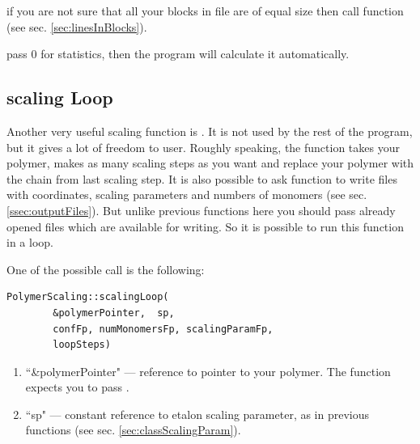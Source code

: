 \documentclass[12pt]{article}
\begin{document}
\begin{mySection}
\hint if you are not sure that all your blocks in file are of equal size then call function  (see sec. \ref{sec:linesInBlocks}). 

\hint pass 0 for statistics, then the program will calculate it automatically.

\subsection{scaling Loop}
Another very useful scaling function is . It is not used by the rest of the program, but it gives a lot of freedom to user.
Roughly speaking, the function takes your polymer, makes as many scaling steps as you want and replace your polymer with the chain from last scaling step. It is also possible to ask function to write files with coordinates, scaling parameters and numbers of monomers (see sec. \ref{ssec:outputFiles}). But unlike previous functions here you should pass already opened files which are available for writing. So it is possible to run this function in a loop.

One of the possible call is the following:
\begin{lstlisting}
PolymerScaling::scalingLoop(
		&polymerPointer,  sp,
		confFp, numMonomersFp, scalingParamFp,
		loopSteps)
\end{lstlisting}
\begin{enumerate}
\item ``\&polymerPointer" --- reference to pointer to your polymer. The function expects you to pass .
\item ``sp" --- constant reference to etalon scaling parameter, as in previous functions (see sec. \ref{sec:classScalingParam}). 
\end{enumerate}

\end{mySection}
\end{document}
